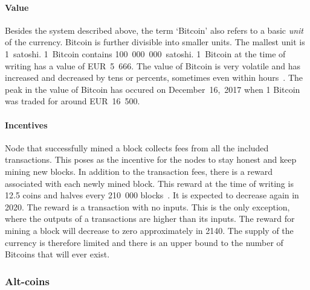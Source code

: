\paragraph{Value}
Besides the system described above, the term `Bitcoin' also refers to a basic \textit{unit} of the currency. Bitcoin is further divisible into smaller units. The mallest unit is 1~satoshi. 1~Bitcoin contains 100~000~000~satoshi. 1~Bitcoin at the time of writing has a value of EUR~5~666. The value of Bitcoin is very volatile and has increased and decreased by tens or percents, sometimes even within hours~\cite{Adkisson2018WhyVolatile}. The peak in the value of Bitcoin has occured on December~16,~2017 when 1 Bitcoin was traded for around EUR~16~500.

\paragraph{Incentives}
Node that successfully mined a block collects fees from all the included transactions. This poses as the incentive for the nodes to stay honest and keep mining new blocks. In addition to the transaction fees, there is a reward associated with each newly mined block. This reward at the time of writing is 12.5 coins and halves every 210~000 blocks~\cite{Judmayer2017BlocksMechanisms}. It is expected to decrease again in 2020. The reward is a transaction with no inputs. This is the only exception, where the outputs of a transactions are higher than its inputs. The reward for mining a block will decrease to zero approximately in 2140. The supply of the currency is therefore limited and there is an upper bound to the number of Bitcoins that will ever exist\footnotemark.


\subsubsection{Alt-coins}

